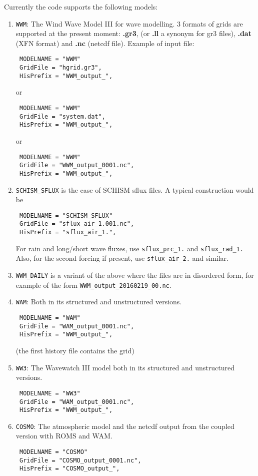\documentclass[12pt]{amsart}
\begin{document}
Currently the code supports the following models:
\begin{enumerate}
\item {\tt WWM}: The Wind Wave Model III for wave modelling. 3 formats of grids are supported at the present moment: {\bf .gr3}, (or {\bf .ll} a synonym for gr3 files), {\bf .dat} (XFN format) and {\bf .nc} (netcdf file).
Example of input file:
\begin{verbatim}
 MODELNAME = "WWM"
 GridFile = "hgrid.gr3",
 HisPrefix = "WWM_output_",
\end{verbatim}
or 
\begin{verbatim}
 MODELNAME = "WWM"
 GridFile = "system.dat",
 HisPrefix = "WWM_output_",
\end{verbatim}
or
\begin{verbatim}
 MODELNAME = "WWM"
 GridFile = "WWM_output_0001.nc",
 HisPrefix = "WWM_output_",
\end{verbatim}
\item {\tt SCHISM\_SFLUX} is the case of SCHISM sflux files. A typical construction would be
\begin{verbatim}
 MODELNAME = "SCHISM_SFLUX"
 GridFile = "sflux_air_1.001.nc",
 HisPrefix = "sflux_air_1.",
\end{verbatim}
For rain and long/short wave fluxes, use {\tt sflux\_prc\_1.} and {\tt sflux\_rad\_1.} Also, for the second forcing if present, use {\tt sflux\_air\_2.} and similar.
\item {\tt WWM\_DAILY} is a variant of the above where the files are in disordered form, for example of the form {\tt WWM\_output\_20160219\_00.nc}.
\item {\tt WAM}: Both in its structured and unstructured versions.
\begin{verbatim}
 MODELNAME = "WAM"
 GridFile = "WAM_output_0001.nc",
 HisPrefix = "WWM_output_",
\end{verbatim}
(the first history file contains the grid)
\item {\tt WW3}: The Wavewatch III model both in its structured and unstructured versions.
\begin{verbatim}
 MODELNAME = "WW3"
 GridFile = "WAM_output_0001.nc",
 HisPrefix = "WWM_output_",
\end{verbatim}
\item {\tt COSMO}: The atmospheric model and the netcdf output from the coupled version with ROMS and WAM.
\begin{verbatim}
 MODELNAME = "COSMO"
 GridFile = "COSMO_output_0001.nc",
 HisPrefix = "COSMO_output_",

\end{verbatim}
\end{enumerate}
\end{document}
